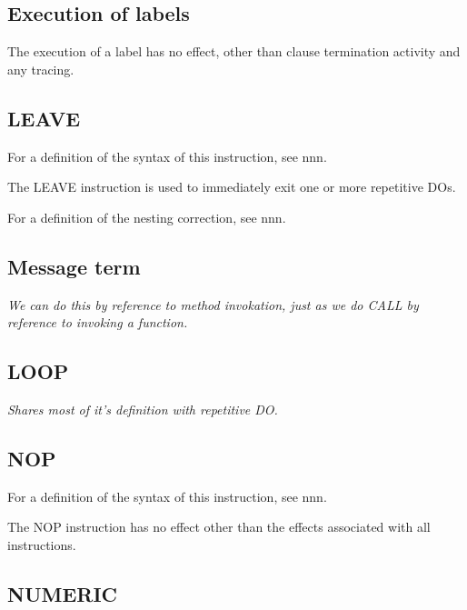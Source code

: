 \subsection{Execution of labels}\label{execution-of-labels}

The execution of a label has no effect, other than clause termination
activity and any tracing.



\subsection{LEAVE}\label{leave}

For a definition of the syntax of this instruction, see nnn.

The LEAVE instruction is used to immediately exit one or more repetitive
DOs.

For a definition of the nesting correction, see nnn.



\subsection{Message term}\label{message-term}

\emph{We can do this by reference to method invokation, just as we do
CALL by reference to invoking a function.}

\subsection{LOOP}\label{loop}

\emph{Shares most of it's definition with repetitive DO.}

\subsection{NOP}\label{nop}

For a definition of the syntax of this instruction, see nnn.

The NOP instruction has no effect other than the effects associated with
all instructions.

\subsection{NUMERIC}\label{numeric}


